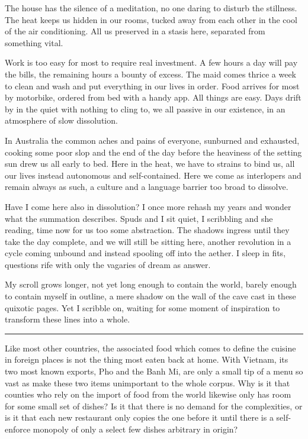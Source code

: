 \documentclass[ebook, 10pt, openright, onecolumn]{memoir}
\newcommand*\starbreak{\fancybreak*{\Large{* * *}}}
\begin{document}
The house has the silence of a meditation, no one daring to disturb the
stillness.  The heat keeps us hidden in our rooms, tucked away from each other
in the cool of the air conditioning. All us preserved in a stasis here,
separated from something vital.

Work is too easy for most to require real investment.  A few hours a day will
pay the bills, the remaining hours a bounty of excess.  The maid comes thrice a
week to clean and wash and put everything in our lives in order.  Food arrives
for most by motorbike, ordered from bed with a handy app.  All things are easy.
Days drift by in the quiet with nothing to cling to, we all passive in our
existence, in an atmosphere of slow dissolution.

In Australia the common aches and pains of everyone, sunburned and exhausted,
cooking some poor slop and the end of the day before the heaviness of the
setting sun drew us all early to bed.  Here in the heat, we have to strains to
bind us, all our lives instead autonomous and self-contained.  Here we come as
interlopers and remain always as such, a culture and a language barrier too
broad to dissolve.

Have I come here also in dissolution?  I once more rehash my years and wonder
what the summation describes.  Spuds and I sit quiet, I scribbling and she
reading, time now for us too some abstraction.  The shadows ingress until they
take the day complete, and we will still be sitting here, another revolution in
a cycle coming unbound and instead spooling off into the aether.  I sleep in
fits, questions rife with only the vagaries of dream as answer.

My scroll grows longer, not yet long enough to contain the world, barely enough
to contain myself in outline, a mere shadow on the wall of the cave cast in
these quixotic pages.  Yet I scribble on, waiting for some moment of inspiration
to transform these lines into a whole.

\starbreak

Like most other countries, the associated food which comes to define the cuisine
in foreign places is not the thing most eaten back at home. With Vietnam, its
two most known exports, Pho and the Banh Mi, are only a small tip of a menu so
vast as make these two items unimportant to the whole corpus.  Why is it that
counties who rely on the import of food from the world likewise only has room
for some small set of dishes?  Is it that there is no demand for the
complexities, or is it that each new restaurant only copies the one before it
until there is a self-enforce monopoly of only a select few dishes arbitrary in
origin?
\end{document}
